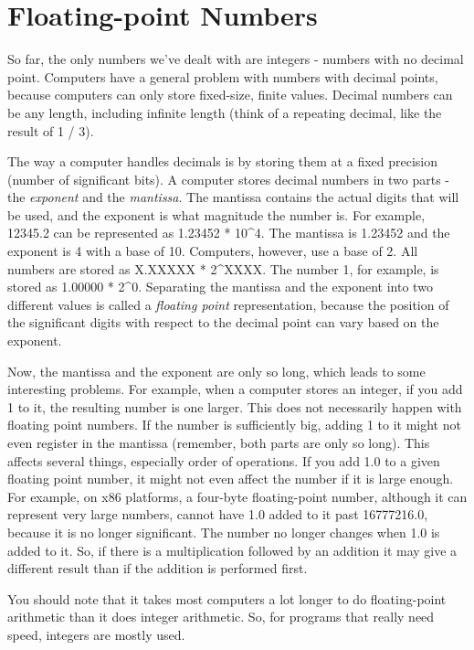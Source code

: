  
\section{Floating-point Numbers}
\label{floatingpoint}

So far, the only numbers we've dealt with are integers - numbers
with no decimal point.  Computers have a general problem with
numbers with decimal points, because computers can only store
fixed-size, finite values.  Decimal numbers can be any length, including
infinite length (think of a repeating decimal, like the result of
1 / 3).

The way a computer handles decimals is by storing them
at a fixed precision (number of significant bits).  
A computer stores decimal numbers in two
parts - the \emph{exponent} and the \emph{mantissa}.  The mantissa contains the actual
digits that will be used, and the exponent is what magnitude the number
is.  For example, 12345.2 can be represented as 1.23452 * 10\textasciicircum 4.  The mantissa
is 1.23452 and the exponent is 4 with a base of 10.  Computers, however, 
use a base of 2.  All numbers are stored
as X.XXXXX * 2\textasciicircum XXXX.  The number 1, for example, is stored as 1.00000 * 2\textasciicircum 0.
Separating the mantissa and the exponent into two different values is called
a \emph{floating point} representation, because the position of the significant digits with respect to the decimal point can vary based on the exponent.

Now, the mantissa and the exponent are only so long, which leads to some 
interesting problems.  For example, when a computer
stores an integer, if you add 1 to it, the resulting number is one larger.
This does not necessarily happen with floating point numbers.  If the
number is sufficiently big, adding 1 to it might
not even register in the mantissa (remember, both parts are only so long).
This affects several things, especially order of operations.  If you
add 1.0 to a given floating point number, it might not even affect the number
if it is large enough.  For example, on x86 platforms, a four-byte 
floating-point number, although it can represent very large numbers, cannot
have 1.0 added to it past 16777216.0, because it is no longer significant.
The number no longer changes when 1.0 is added to it.  So, if there is
a multiplication followed by an addition it may give a different result than
if the addition is performed first.

You should note that it takes most computers a lot longer
to do floating-point arithmetic than it does integer arithmetic.  So,
for programs that really need speed, integers are mostly used.  

